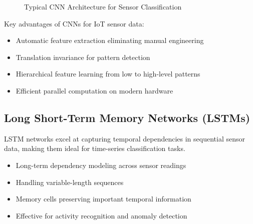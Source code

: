 \documentclass[12pt,a4paper]{article}
\begin{document}
\begin{figure}[H]
\centering
{}
\caption{Typical CNN Architecture for Sensor Classification}
\end{figure}

Key advantages of CNNs for IoT sensor data:
\begin{itemize}
    \item Automatic feature extraction eliminating manual engineering
    \item Translation invariance for pattern detection
    \item Hierarchical feature learning from low to high-level patterns
    \item Efficient parallel computation on modern hardware
\end{itemize}

\subsection{Long Short-Term Memory Networks (LSTMs)}

LSTM networks excel at capturing temporal dependencies in sequential sensor data, making them ideal for time-series classification tasks.

\begin{tcolorbox}[colback=iotgreen!10, colframe=iotgreen, title=LSTM Advantages for IoT]
\begin{itemize}
    \item Long-term dependency modeling across sensor readings
    \item Handling variable-length sequences
    \item Memory cells preserving important temporal information
    \item Effective for activity recognition and anomaly detection
\end{itemize}
\end{tcolorbox}
\end{document}
